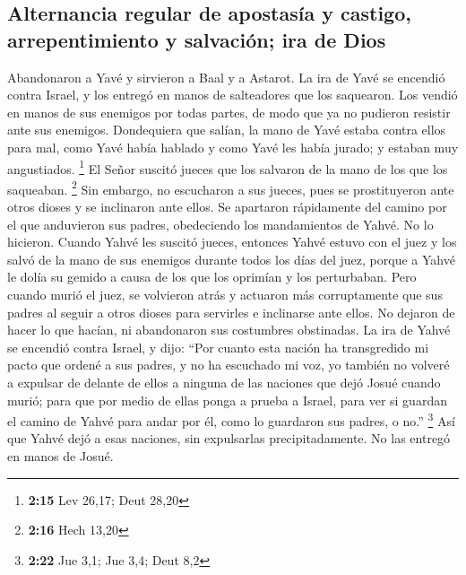 \begin{paracol}{2}
\hypertarget{alternancia-regular-de-apostasuxeda-y-castigo-arrepentimiento-y-salvaciuxf3n-ira-de-dios}{%
\subsection{Alternancia regular de apostasía y castigo, arrepentimiento
y salvación; ira de
Dios}\label{alternancia-regular-de-apostasuxeda-y-castigo-arrepentimiento-y-salvaciuxf3n-ira-de-dios}}

 Abandonaron a Yavé y sirvieron a Baal y a Astarot.
 La ira de Yavé se encendió contra Israel, y los entregó
en manos de salteadores que los saquearon. Los vendió en manos de sus
enemigos por todas partes, de modo que ya no pudieron resistir ante sus
enemigos.  Dondequiera que salían, la mano de Yavé estaba
contra ellos para mal, como Yavé había hablado y como Yavé les había
jurado; y estaban muy angustiados. \footnote{\textbf{2:15} Lev 26,17;
  Deut 28,20}  El Señor suscitó jueces que los salvaron
de la mano de los que los saqueaban. \footnote{\textbf{2:16} Hech 13,20}
 Sin embargo, no escucharon a sus jueces, pues se
prostituyeron ante otros dioses y se inclinaron ante ellos. Se apartaron
rápidamente del camino por el que anduvieron sus padres, obedeciendo los
mandamientos de Yahvé. No lo hicieron.  Cuando Yahvé les
suscitó jueces, entonces Yahvé estuvo con el juez y los salvó de la mano
de sus enemigos durante todos los días del juez, porque a Yahvé le dolía
su gemido a causa de los que los oprimían y los perturbaban.
 Pero cuando murió el juez, se volvieron atrás y actuaron
más corruptamente que sus padres al seguir a otros dioses para servirles
e inclinarse ante ellos. No dejaron de hacer lo que hacían, ni
abandonaron sus costumbres obstinadas.  La ira de Yahvé
se encendió contra Israel, y dijo: ``Por cuanto esta nación ha
transgredido mi pacto que ordené a sus padres, y no ha escuchado mi voz,
 yo también no volveré a expulsar de delante de ellos a
ninguna de las naciones que dejó Josué cuando murió; 
para que por medio de ellas ponga a prueba a Israel, para ver si guardan
el camino de Yahvé para andar por él, como lo guardaron sus padres, o
no.'' \footnote{\textbf{2:22} Jue 3,1; Jue 3,4; Deut 8,2}
 Así que Yahvé dejó a esas naciones, sin expulsarlas
precipitadamente. No las entregó en manos de Josué.

\switchcolumn
\begin{otherlanguage}{english}


\end{otherlanguage}
\end{paracol}
